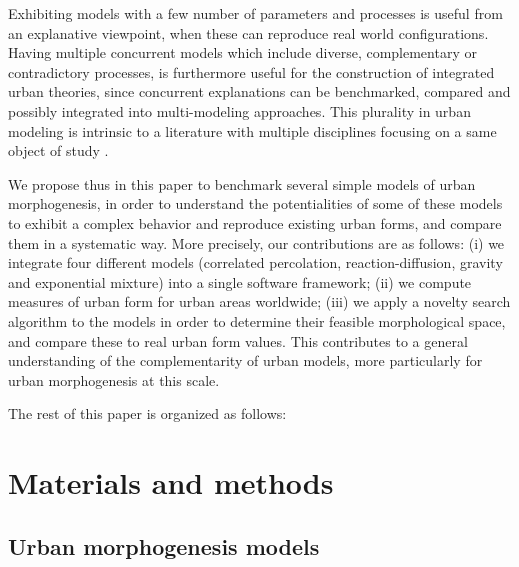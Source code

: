\documentclass[10pt]{article}
\begin{document}

Exhibiting models with a few number of parameters and processes is useful from an explanative viewpoint, when these can reproduce real world configurations. Having multiple concurrent models which include diverse, complementary or contradictory processes, is furthermore useful for the construction of integrated urban theories, since concurrent explanations can be benchmarked, compared and possibly integrated into multi-modeling approaches. This plurality in urban modeling is intrinsic to a literature with multiple disciplines focusing on a same object of study \cite{pumain2020conclusion}.



We propose thus in this paper to benchmark several simple models of urban morphogenesis, in order to understand the potentialities of some of these models to exhibit a complex behavior and reproduce existing urban forms, and compare them in a systematic way. More precisely, our contributions are as follows: (i) we integrate four different models (correlated percolation, reaction-diffusion, gravity and exponential mixture) into a single software framework; (ii) we compute measures of urban form for urban areas worldwide; (iii) we apply a novelty search algorithm to the models in order to determine their feasible morphological space, and compare these to real urban form values. This contributes to a general understanding of the complementarity of urban models, more particularly for urban morphogenesis at this scale.



The rest of this paper is organized as follows:



\section*{Materials and methods}


\subsection*{Urban morphogenesis models}
\end{document}
